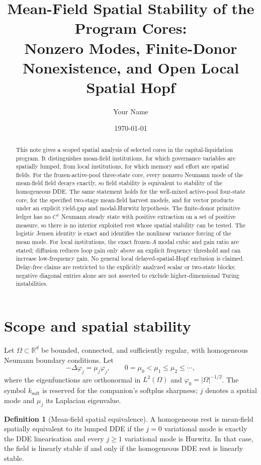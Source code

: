\documentclass[11pt]{article}
\title{Mean-Field Spatial Stability of the Program Cores:\\
Nonzero Modes, Finite-Donor Nonexistence, and Open Local Spatial Hopf}
\author{Your Name}
\date{\today}
\theoremstyle{definition}
\newtheorem{definition}{Definition}
\begin{document}
\maketitle

\begin{abstract}
This note gives a scoped spatial analysis of selected cores in the capital-liquidation program. It distinguishes mean-field institutions, for which governance variables are spatially lumped, from local institutions, for which memory and effort are spatial fields. For the frozen-active-pool three-state core, every nonzero Neumann mode of the mean-field field decays exactly, so field stability is equivalent to stability of the homogeneous DDE. The same statement holds for the well-mixed active-pool four-state core, for the specified two-stage mean-field harvest models, and for vector products under an explicit yield-gap and modal-Hurwitz hypothesis. The finite-donor primitive ledger has no $C^1$ Neumann steady state with positive extraction on a set of positive measure, so there is no interior exploited rest whose spatial stability can be tested. The logistic Jensen identity is exact and identifies the nonlinear variance forcing of the mean mode. For local institutions, the exact frozen-$A$ modal cubic and gain ratio are stated; diffusion reduces loop gain only above an explicit frequency threshold and can increase low-frequency gain. No general local delayed-spatial-Hopf exclusion is claimed. Delay-free claims are restricted to the explicitly analyzed scalar or two-state blocks; negative diagonal entries alone are not asserted to exclude higher-dimensional Turing instabilities.
\end{abstract}

\section{Scope and spatial stability}
\label{sec:scope}

Let $\Omega\subset\mathbb R^d$ be bounded, connected, and sufficiently regular, with homogeneous Neumann boundary conditions. Let
\[
-\Delta\varphi_j=\mu_j\varphi_j,
\qquad 0=\mu_0<\mu_1\le\mu_2\le\cdots,
\]
where the eigenfunctions are orthonormal in $L^2(\Omega)$ and $\varphi_0=|\Omega|^{-1/2}$. The symbol $k_{\mathrm{soft}}$ is reserved for the companion's softplus sharpness; $j$ denotes a spatial mode and $\mu_j$ its Laplacian eigenvalue.

\begin{definition}[Mean-field spatial equivalence]
A homogeneous rest is mean-field spatially equivalent to its lumped DDE if the $j=0$ variational mode is exactly the DDE linearisation and every $j\ge1$ variational mode is Hurwitz. In that case, the field is linearly stable if and only if the homogeneous DDE rest is linearly stable.
\end{definition}
\end{document}
